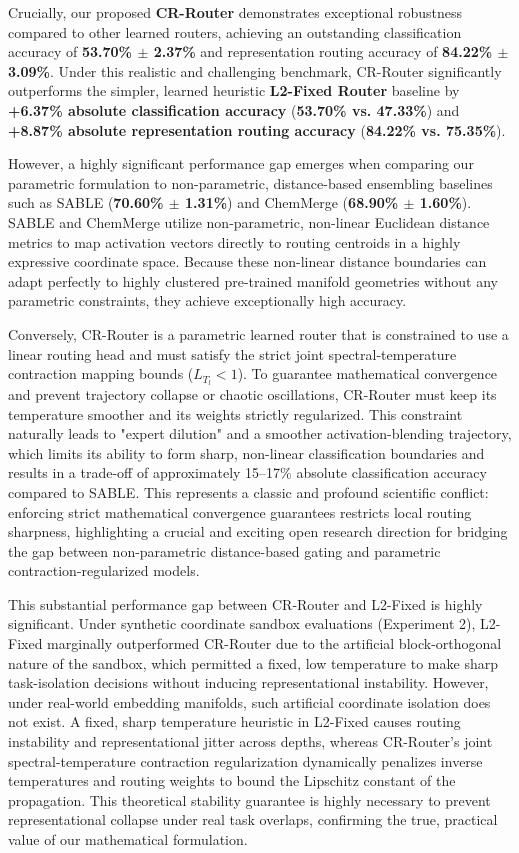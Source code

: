 Crucially, our proposed \textbf{CR-Router} demonstrates exceptional robustness compared to other learned routers, achieving an outstanding classification accuracy of \textbf{53.70\% $\pm$ 2.37\%} and representation routing accuracy of \textbf{84.22\% $\pm$ 3.09\%}. Under this realistic and challenging benchmark, CR-Router significantly outperforms the simpler, learned heuristic \textbf{L2-Fixed Router} baseline by \textbf{+6.37\% absolute classification accuracy} (\textbf{53.70\% vs. 47.33\%}) and \textbf{+8.87\% absolute representation routing accuracy} (\textbf{84.22\% vs. 75.35\%}).

However, a highly significant performance gap emerges when comparing our parametric formulation to non-parametric, distance-based ensembling baselines such as SABLE (\textbf{70.60\% $\pm$ 1.31\%}) and ChemMerge (\textbf{68.90\% $\pm$ 1.60\%}). SABLE and ChemMerge utilize non-parametric, non-linear Euclidean distance metrics to map activation vectors directly to routing centroids in a highly expressive coordinate space. Because these non-linear distance boundaries can adapt perfectly to highly clustered pre-trained manifold geometries without any parametric constraints, they achieve exceptionally high accuracy.

Conversely, CR-Router is a parametric learned router that is constrained to use a linear routing head and must satisfy the strict joint spectral-temperature contraction mapping bounds ($L_{T_l} < 1$). To guarantee mathematical convergence and prevent trajectory collapse or chaotic oscillations, CR-Router must keep its temperature smoother and its weights strictly regularized. This constraint naturally leads to "expert dilution" and a smoother activation-blending trajectory, which limits its ability to form sharp, non-linear classification boundaries and results in a trade-off of approximately 15--17\% absolute classification accuracy compared to SABLE. This represents a classic and profound scientific conflict: enforcing strict mathematical convergence guarantees restricts local routing sharpness, highlighting a crucial and exciting open research direction for bridging the gap between non-parametric distance-based gating and parametric contraction-regularized models.

This substantial performance gap between CR-Router and L2-Fixed is highly significant. Under synthetic coordinate sandbox evaluations (Experiment 2), L2-Fixed marginally outperformed CR-Router due to the artificial block-orthogonal nature of the sandbox, which permitted a fixed, low temperature to make sharp task-isolation decisions without inducing representational instability. However, under real-world embedding manifolds, such artificial coordinate isolation does not exist. A fixed, sharp temperature heuristic in L2-Fixed causes routing instability and representational jitter across depths, whereas CR-Router's joint spectral-temperature contraction regularization dynamically penalizes inverse temperatures and routing weights to bound the Lipschitz constant of the propagation. This theoretical stability guarantee is highly necessary to prevent representational collapse under real task overlaps, confirming the true, practical value of our mathematical formulation.

